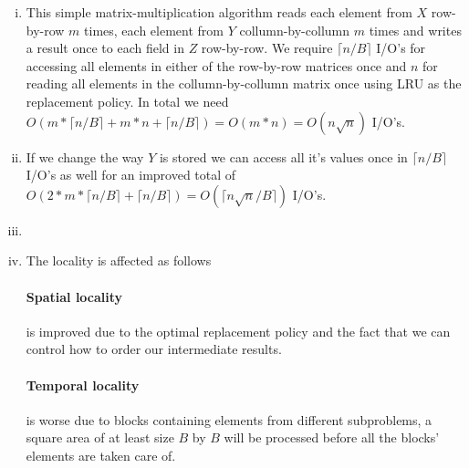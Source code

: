 \begin{enumerate}[(i)]
	\item
This simple matrix-multiplication algorithm reads each element from $X$ row-by-row $m$ times, each element from $Y$ collumn-by-collumn $m$ times and writes a result once to each field in $Z$ row-by-row. We require $\lceil n/B \rceil$ I/O's for accessing all elements in either of the row-by-row matrices once and $n$ for reading all elements in the collumn-by-collumn matrix once using \textsc{LRU} as the replacement policy. In total we need $O(m * \lceil n/B \rceil + m * n + \lceil n/B \rceil) = O(m * n) = O(n\sqrt{n})$ I/O's.
	\item
If we change the way $Y$ is stored we can access all it's values once in $\lceil n/B \rceil$ I/O's as well for an improved total of $O(2 * m * \lceil n/B \rceil +  \lceil n/B \rceil) = O(\lceil n\sqrt{n}/B \rceil)$ I/O's.
	\item

	\item The locality is affected as follows
\paragraph{Spatial locality} is improved due to the optimal replacement policy and the fact that we can control how to order our intermediate results.
\paragraph{Temporal locality} is worse due to blocks containing elements from different subproblems, a square area of at least size $B$ by $B$ will be processed before all the blocks' elements are taken care of.
\end{enumerate}
